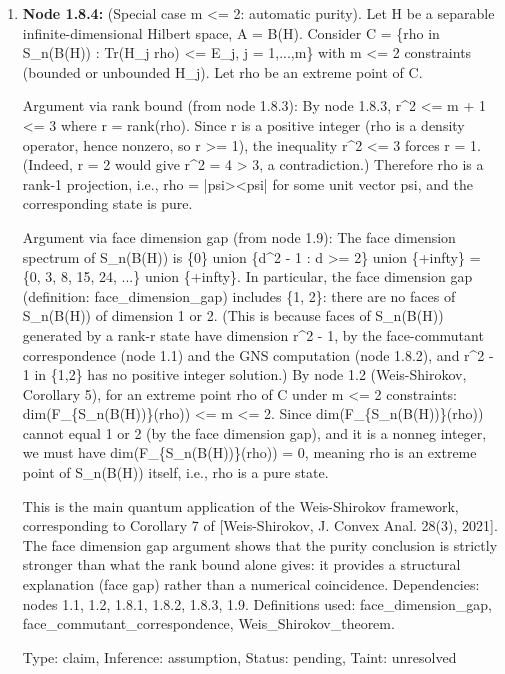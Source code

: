 \documentclass{article}
\begin{document}
\begin{enumerate}
\begin{enumerate}
  Type: claim, Inference: assumption, Status: pending, Taint: unresolved

\item \textbf{Node 1.8.4:} (Special case m <= 2: automatic purity). Let H be a separable infinite-dimensional Hilbert space, A = B(H). Consider C = \{rho in S\_n(B(H)) : Tr(H\_j rho) <= E\_j, j = 1,...,m\} with m <= 2 constraints (bounded or unbounded H\_j). Let rho be an extreme point of C.

Argument via rank bound (from node 1.8.3): By node 1.8.3, r\textasciicircum{}2 <= m + 1 <= 3 where r = rank(rho). Since r is a positive integer (rho is a density operator, hence nonzero, so r >= 1), the inequality r\textasciicircum{}2 <= 3 forces r = 1. (Indeed, r = 2 would give r\textasciicircum{}2 = 4 > 3, a contradiction.) Therefore rho is a rank-1 projection, i.e., rho = |psi><psi| for some unit vector psi, and the corresponding state is pure.

Argument via face dimension gap (from node 1.9): The face dimension spectrum of S\_n(B(H)) is \{0\} union \{d\textasciicircum{}2 - 1 : d >= 2\} union \{+infty\} = \{0, 3, 8, 15, 24, ...\} union \{+infty\}. In particular, the face dimension gap (definition: face\_dimension\_gap) includes \{1, 2\}: there are no faces of S\_n(B(H)) of dimension 1 or 2. (This is because faces of S\_n(B(H)) generated by a rank-r state have dimension r\textasciicircum{}2 - 1, by the face-commutant correspondence (node 1.1) and the GNS computation (node 1.8.2), and r\textasciicircum{}2 - 1 in \{1,2\} has no positive integer solution.) By node 1.2 (Weis-Shirokov, Corollary 5), for an extreme point rho of C under m <= 2 constraints: dim(F\_\{S\_n(B(H))\}(rho)) <= m <= 2. Since dim(F\_\{S\_n(B(H))\}(rho)) cannot equal 1 or 2 (by the face dimension gap), and it is a nonneg integer, we must have dim(F\_\{S\_n(B(H))\}(rho)) = 0, meaning rho is an extreme point of S\_n(B(H)) itself, i.e., rho is a pure state.

This is the main quantum application of the Weis-Shirokov framework, corresponding to Corollary 7 of [Weis-Shirokov, J. Convex Anal. 28(3), 2021]. The face dimension gap argument shows that the purity conclusion is strictly stronger than what the rank bound alone gives: it provides a structural explanation (face gap) rather than a numerical coincidence. Dependencies: nodes 1.1, 1.2, 1.8.1, 1.8.2, 1.8.3, 1.9. Definitions used: face\_dimension\_gap, face\_commutant\_correspondence, Weis\_Shirokov\_theorem.

  Type: claim, Inference: assumption, Status: pending, Taint: unresolved


\end{enumerate}
\end{enumerate}
\end{document}
